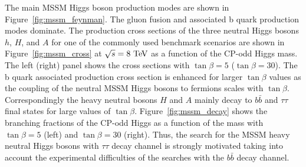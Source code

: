 The main MSSM Higgs boson production modes are shown in Figure~\ref{fig:mssm_feynman}. The gluon fusion and associated b quark production modes dominate. The production cross sections of the three neutral Higgs bosons $h$, $H$, and $A$ for one of the commonly used benchmark scenarios are shown in Figure~\ref{fig:mssm_cross} at $\sqrt{s}=8~\mathrm{Te\kern -0.1em V}$ as a function of the CP-odd Higgs mass. The left (right) panel shows the cross sections with $\tan \beta = 5$ ($\tan \beta =30$).  The b quark associated production cross section is enhanced for larger $\tan \beta$ values as the coupling of the neutral MSSM Higgs bosons to fermions scales with $\tan \beta$. Correspondingly the heavy neutral bosons $H$ and $A$ mainly decay to $b\bar{b}$ and $\tau\tau$ final states for large values of $\tan \beta$. Figure~\ref{fig:mssm_decay} shows the branching fractions of the CP-odd Higgs as a function of the mass with $\tan \beta=5$ (left) and $\tan \beta=30$ (right). Thus, the search for the MSSM heavy neutral Higgs bosons with $\tau\tau$ decay channel is strongly motivated taking into account the experimental difficulties of the searches with the $b\bar{b}$ decay channel.
   